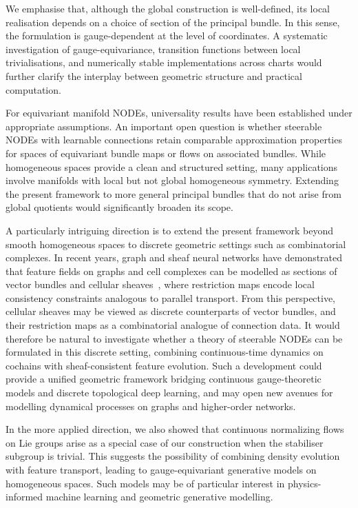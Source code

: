 \documentclass[12pt,a4paper]{article}
\numberwithin{equation}{section}
\theoremstyle{plain}
\theoremstyle{definition}
\theoremstyle{remark}
\begin{document}
We emphasise that, although the global construction is well-defined, its local realisation depends on a choice of section of the principal bundle. In this sense, the formulation is gauge-dependent at the level of coordinates. A systematic investigation of gauge-equivariance, transition functions between local trivialisations, and numerically stable implementations across charts would further clarify the interplay between geometric structure and practical computation.

For equivariant manifold NODEs, universality results have been established under appropriate assumptions. An important open question is whether steerable NODEs with learnable connections retain comparable approximation properties for spaces of equivariant bundle maps or flows on associated bundles. While homogeneous spaces provide a clean and structured setting, many applications involve manifolds with local but not global homogeneous symmetry. Extending the present framework to more general principal bundles that do not arise from global quotients would significantly broaden its scope.

A particularly intriguing direction is to extend the present framework beyond smooth homogeneous spaces to discrete geometric settings such as combinatorial complexes. In recent years, graph and sheaf neural networks have demonstrated that feature fields on graphs and cell complexes can be modelled as sections of vector bundles \cite{Cassel2025} and cellular sheaves~\cite{Hansen2020,Barbero2022}, where restriction maps encode local consistency constraints analogous to parallel transport. From this perspective, cellular sheaves may be viewed as discrete counterparts of vector bundles, and their restriction maps as a combinatorial analogue of connection data. It would therefore be natural to investigate whether a theory of steerable NODEs can be formulated in this discrete setting, combining continuous-time dynamics on cochains with sheaf-consistent feature evolution. Such a development could provide a unified geometric framework bridging continuous gauge-theoretic models and discrete topological deep learning, and may open new avenues for modelling dynamical processes on graphs and higher-order networks.

In the more applied direction, we also showed that continuous normalizing flows on Lie groups arise as a special case of our construction when the stabiliser subgroup is trivial. This suggests the possibility of combining density evolution with feature transport, leading to gauge-equivariant generative models on homogeneous spaces. Such models may be of particular interest in physics-informed machine learning and geometric generative modelling.
\end{document}
